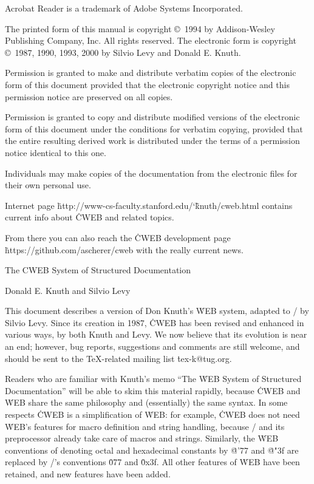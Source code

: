 \noindent
Acrobat Reader is a trademark of Adobe Systems Incorporated.

\bigskip\noindent
The printed form of this manual is copyright \copyright\ 1994
  by Addison-Wesley Publishing Company, Inc.  All rights reserved.
\smallskip\noindent
The electronic form is copyright \copyright\ 1987, 1990, 1993, 2000
  by Silvio Levy and Donald E. Knuth.

\bigskip\noindent
Permission is granted to make and distribute verbatim copies of the
electronic form of this document provided that the electronic copyright
notice and this permission notice are preserved on all copies.

\smallskip\noindent
Permission is granted to copy and distribute modified versions of the
electronic form of this document under the conditions for verbatim copying,
provided that the entire resulting derived work is distributed under the terms
of a permission notice identical to this one.

\smallskip\noindent
Individuals may make copies of the documentation from the electronic files
for their own personal use.

\smallskip\noindent
Internet page \.{http://www-cs-faculty.stanford.edu/\char`\~knuth/cweb.html}
contains current info about \.{CWEB} and related topics.

\smallskip\noindent
From there you can also reach the \.{CWEB} development page
\.{https://github.com/ascherer/cweb} with the really current news.

 \titletrue\eject

\titletrue
\centerline{\titlefont The {\ttitlefont CWEB} System of
    Structured Documentation}

\centerline{\authorfont Donald E. Knuth and Silvio Levy}

\noindent
This document describes a version of Don Knuth's \.{WEB} system,
adapted to \CEE/ by Silvio Levy.  Since its creation in 1987, \.{CWEB}
has been revised and enhanced in various ways, by both Knuth and Levy.
We now believe that its evolution is near an end; however, bug
reports, suggestions and comments are still welcome, and
should be sent to the \TeX-related mailing list \.{tex-k@tug.org}.

Readers who are familiar with Knuth's memo ``The \.{WEB} System of Structured
Documentation'' will be able
to skim this material rapidly, because \.{CWEB} and \.{WEB} share
the same philosophy and (essentially) the same syntax.  In some respects
\.{CWEB} is a simplification
of \.{WEB}: for example, \.{CWEB} does not need \.{WEB}'s features
for macro definition and string handling, because \CEE/ and its
preprocessor already take care of macros and strings. Similarly, the \.{WEB}
conventions of denoting octal and hexadecimal constants by \.{@'77}
and \.{@"3f} are replaced by \CEE/'s conventions \.{077} and
\.{0x3f}. All other features of \.{WEB} have been
retained, and new features have been added.

